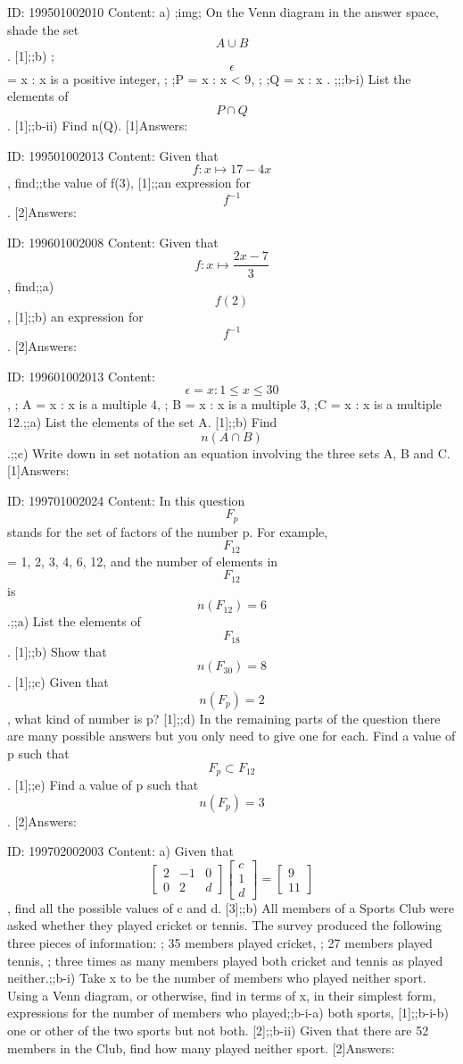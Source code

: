 \documentclass{article}
\begin{document}
ID: 199501002010
Content:
a) ;img; On the Venn diagram in the answer space, shade the set $$A \cup B$$. [1];;b) ; $$\epsilon$$ = {x : x is a positive integer}, ; ;P = {x : x < 9},  ; ;Q = {x : x  }. ;;;b-i) List the elements of $$P \cap Q$$. [1];;b-ii) Find n(Q). [1]Answers:

ID: 199501002013
Content:
Given that $$f: x \mapsto 17 - 4x$$, find;;the value of f(3), [1];;an expression for $$f^{-1}$$. [2]Answers:

ID: 199601002008
Content:
Given that $$f : x \mapsto \frac{2x - 7}{3}$$, find;;a) $$f(2)$$, [1];;b) an expression for $$f^{-1}$$. [2]Answers:

ID: 199601002013
Content:
$$\epsilon = {x: 1 \leq x \leq 30}$$, ; A = {x : x is a multiple 4}, ; B = {x : x is a multiple 3}, ;C = {x : x is a multiple 12}.;;a) List the elements of the set A. [1];;b) Find $$n(A \cap B)$$.;;c) Write down in set notation an equation involving the three sets A, B and C. [1]Answers:

ID: 199701002024
Content:
In this question $$F_p$$ stands for the set of factors of the number p. For example, $$F_{12}$$ = {1, 2, 3, 4, 6, 12}, and the number of elements in $$F_{12}$$ is $$n(F_{12}) = 6$$.;;a) List the elements of $$F_{18}$$. [1];;b) Show that $$n(F_{30}) = 8$$. [1];;c) Given that $$n(F_{p}) = 2$$, what kind of number is p? [1];;d) In the remaining parts of the question there are many possible answers but you only need to give one for each. Find a value of p such that $$F_p \subset F_{12}$$. [1];;e) Find a value of p such that $$n(F_p) = 3$$. [2]Answers:

ID: 199702002003
Content:
a) Given that $$\begin{bmatrix}2&-1&0\\0&2&d\end{bmatrix}\begin{bmatrix}c\\1\\d\end{bmatrix}=\begin{bmatrix}9\\11\end{bmatrix}$$, find all the possible values of c and d. [3];;b) All members of a Sports Club were asked whether they played cricket or tennis. The survey produced the following three pieces of information: ; 35 members played cricket, ; 27 members played tennis, ; three times as many members played both cricket and tennis as played neither.;;b-i) Take x to be the number of members who played neither sport. Using a Venn diagram, or otherwise, find in terms of x, in their simplest form, expressions for the number of members who played;;b-i-a) both sports, [1];;b-i-b) one or other of the two sports but not both. [2];;b-ii) Given that there are 52 members in the Club, find how many played neither sport. [2]Answers:
\end{document}
